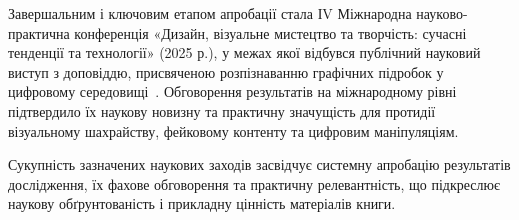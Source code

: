 Завершальним і ключовим етапом апробації стала ІV Міжнародна науково-практична конференція «Дизайн, візуальне мистецтво та творчість: сучасні тенденції та технології» (2025 р.), у межах якої відбувся публічний науковий виступ з доповіддю, присвяченою розпізнаванню графічних підробок у цифровому середовищі~\cite{Evdokymov2025Design}. Обговорення результатів на міжнародному рівні підтвердило їх наукову новизну та практичну значущість для протидії візуальному шахрайству, фейковому контенту та цифровим маніпуляціям.

Сукупність зазначених наукових заходів засвідчує системну апробацію результатів дослідження, їх фахове обговорення та практичну релевантність, що підкреслює наукову обґрунтованість і прикладну цінність матеріалів книги.



\clearpage %
